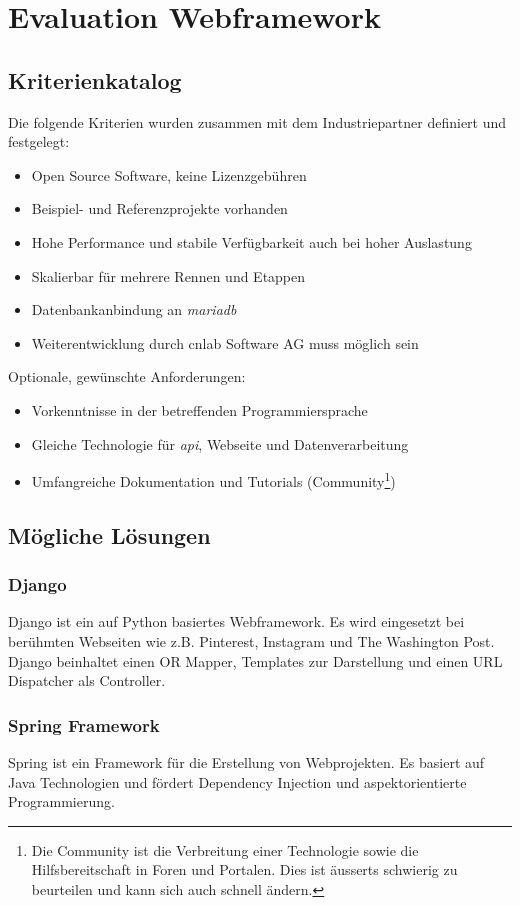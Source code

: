 \section{Evaluation Webframework}
\label{sec:evaluationwebframework}
\subsection{Kriterienkatalog}
Die folgende Kriterien wurden zusammen mit dem Industriepartner definiert und festgelegt:
\begin{itemize}
\item Open Source Software, keine Lizenzgebühren
\item Beispiel- und Referenzprojekte vorhanden
\item Hohe Performance und stabile Verfügbarkeit auch bei hoher Auslastung
\item Skalierbar für mehrere Rennen und Etappen
\item Datenbankanbindung an \textit{\gls{mariadb}}
\item Weiterentwicklung durch cnlab Software AG muss möglich sein
\end{itemize}
Optionale, gewünschte Anforderungen:
\begin{itemize}
\item Vorkenntnisse in der betreffenden Programmiersprache
\item Gleiche Technologie für \textit{\gls{api}}, Webseite und Datenverarbeitung
\item Umfangreiche Dokumentation und Tutorials (Community\footnote{Die Community ist die Verbreitung einer Technologie sowie die Hilfsbereitschaft in Foren und Portalen. Dies ist äusserts schwierig zu beurteilen und kann sich auch schnell ändern.})
\end{itemize}
\subsection{Mögliche Lösungen}
\subsubsection{Django}
Django ist ein auf Python basiertes Webframework. Es wird eingesetzt bei berühmten Webseiten wie z.B. Pinterest, Instagram und The Washington Post.  Django beinhaltet einen OR Mapper, Templates zur Darstellung und einen URL Dispatcher als Controller.
\subsubsection{Spring Framework}
Spring ist ein Framework für die Erstellung von Webprojekten. Es basiert auf Java Technologien und fördert Dependency Injection  und aspektorientierte Programmierung.
